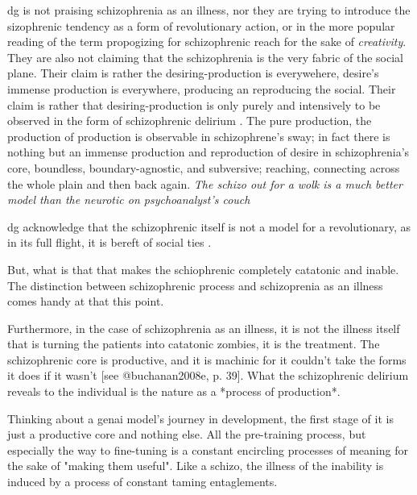 \gls{dg} is not praising schizophrenia as an illness, nor they are trying to introduce the
sizophrenic tendency as a form of revolutionary action, or in the more popular
reading of the term propogizing for schizophrenic reach for the sake of
\textit{creativity}. They are also not
claiming that the schizophrenia is the very fabric of the social plane. Their
claim is rather the desiring-production is everywehere, desire's immense
production is everywhere, producing an reproducing the social. Their claim is
rather that desiring-production is only purely and intensively to be observed
in the form of schizophrenic delirium \parencite[43]{buchanan2008b}. The pure
production, the production of production is observable in schizophrene's sway;
in fact there is nothing but an immense production and reproduction of desire
in schizophrenia's core, boundless, boundary-agnostic, and subversive;
reaching, connecting across the whole plain and then back again. \textit{The
	schizo out for a wolk is a much better model than the neurotic on
	psychoanalyst's couch}

\gls{dg}  acknowledge that the schizophrenic itself is  not a model for a revolutionary, as in its full flight, it is bereft of social ties \parencite[50]{buchanan2008b}.

But, what is that that makes the schiophrenic completely catatonic and inable.
The distinction between schizophrenic process and schizoprenia as an illness
comes handy at that this point.


\begin{orangebox}
	Furthermore, in the case of schizophrenia as an illness, it is not the illness itself that is turning the patients into catatonic zombies, it is the treatment. The schizophrenic core is productive, and it is machinic for it couldn't take the forms it does if it wasn't [see @buchanan2008e, p. 39]. What the schizophrenic delirium reveals to the individual is the nature as a *process of production*.
\end{orangebox}

Thinking about a \gls{genai} model's journey in development, the first stage of
it is just a productive core and nothing else. All the pre-training process,
but especially the way to fine-tuning is a constant encircling processes of
meaning for the sake of "making them useful". Like a schizo, the illness of the
inability is induced by a process of constant taming entaglements.


